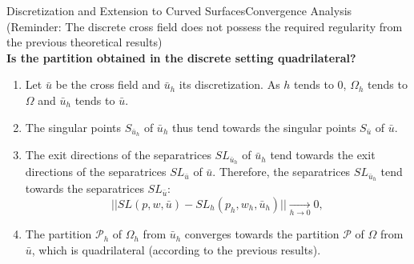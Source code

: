 \documentclass[compress,10pt,aspectratio=169]{beamer}
\begin{document}
\begin{frame}{Discretization and Extension to Curved Surfaces}{Convergence Analysis}
\small
\vspace{-0.3cm}
(Reminder: The discrete cross field does not possess the required regularity from the previous theoretical results)\\
\vspace{0.2cm}
\textbf{Is the partition obtained in the discrete setting quadrilateral?}\\
\vspace{0.2cm}
\begin{enumerate}
    \item Let $\bar{u}$ be the cross field and $\bar{u}_h$ its discretization. As $h$ tends to $0$, $\Omega_h$ tends to $\Omega$ and $\bar{u}_h$ tends to $\bar{u}$.
    \item The singular points $S_{\bar{u}_h}$ of $\bar{u}_h$ thus tend towards the singular points $S_{\bar{u}}$ of $\bar{u}$.
    \item The exit directions of the separatrices $SL_{\bar{u}_h}$ of $\bar{u}_h$ tend towards the exit directions of the separatrices $SL_{\bar{u}}$ of $\bar{u}$. Therefore, the separatrices $SL_{\bar{u}_h}$ tend towards the separatrices $SL_{\bar{u}}$:
    \begin{equation*}
    ||SL(p,w,\bar{u}) - SL_h(p_h,w_h,\bar{u}_h)|| \xrightarrow[h \to 0]{} 0,
    \end{equation*}
    \item The partition $\mathcal{P}_h$ of $\Omega_h$ from $\bar{u}_h$ converges towards the partition $\mathcal{P}$ of $\Omega$ from $\bar{u}$, which is quadrilateral (according to the previous results).
\end{enumerate}
\end{frame}
\end{document}
